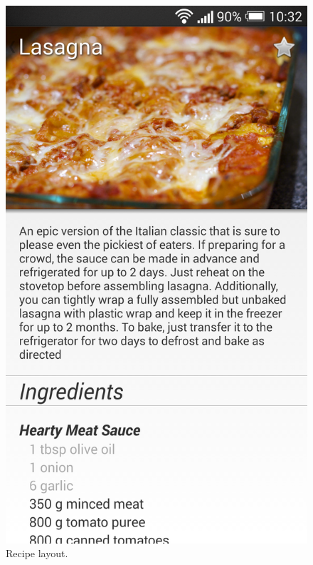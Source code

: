 \begin{figure}[H]
\begin{minipage}[t]{0.5\columnwidth}
\includegraphics[width=0.7\columnwidth]{img/screenshots/finalrecipe1.png}
\caption{Recipe layout\label{fig:recipe1}.}
\end{minipage}
\end{figure}


